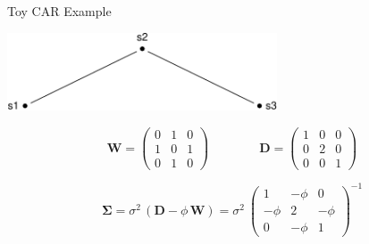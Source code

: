 \documentclass[11pt,ignorenonframetext,]{beamer}
\begin{document}
\begin{frame}[t]{Toy CAR Example}

\vspace{-3mm}

\begin{center}\includegraphics[width=0.6\textwidth]{Lec19_files/figure-beamer/unnamed-chunk-1-1} \end{center}

\pause

\[
\bm{W} = \begin{pmatrix}
0 & 1 & 0 \\
1 & 0 & 1 \\
0 & 1 & 0 
\end{pmatrix}
\qquad\qquad
\bm{D} = \begin{pmatrix}
1 & 0 & 0 \\
0 & 2 & 0 \\
0 & 0 & 1 
\end{pmatrix}
\]

\[
\bm\Sigma = \sigma^2 \, (\bm{D} - \phi \, \bm{W}) = \sigma^2~\begin{pmatrix}
1 & -\phi & 0 \\
-\phi & 2 & -\phi \\
0 & -\phi & 1 
\end{pmatrix}^{-1}
\]

\end{frame}
\end{document}
